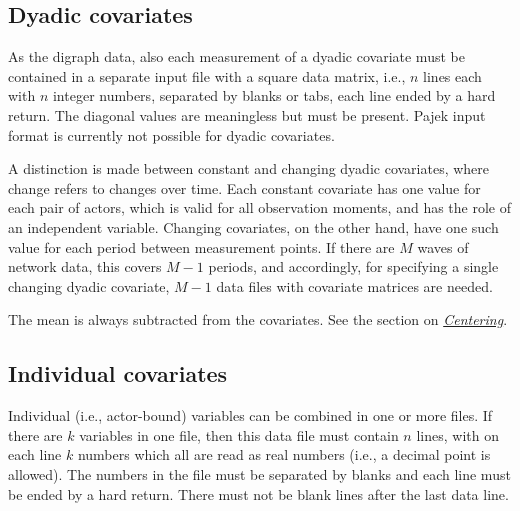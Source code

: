 \documentclass[a4paper,fleqn]{article}
\newcommand{\+}{\, + \,}
\begin{document}
{\subsection{Dyadic covariates}

As the digraph data, also each measurement of a dyadic covariate
must be contained in a separate input file with a square data
matrix, i.e., $n$ lines each with $n$ integer numbers, separated by
blanks or tabs, each line ended by a hard return. The diagonal values are
meaningless but must be present.
Pajek input format is currently not possible for dyadic covariates.

A distinction is made between constant and changing dyadic
covariates, where change refers to changes over time. Each constant
covariate has one value for each pair of actors, which is valid for
all observation moments, and has the role of an independent
variable. Changing covariates, on the other hand, have one such
value for each period between measurement points. If there are $M$
waves of network data, this covers $M-1$ periods, and accordingly,
for specifying a single changing dyadic covariate, $M-1$ data files
with covariate matrices are needed.


The mean is always subtracted from the covariates.
See the section on \hyperlink{T_S_centering}{\emph{Centering}}.

\subsection{Individual covariates}

Individual (i.e., actor-bound) variables can be combined in one or
more files. If there are $k$ variables in one file, then this data
file must contain $n$ lines, with on each line $k$ numbers which all
are read as real numbers (i.e., a decimal point is allowed). The
numbers in the file must be separated by blanks and each line must
be ended by a hard return. There must not be blank lines after the
last data line.

}
\end{document}
